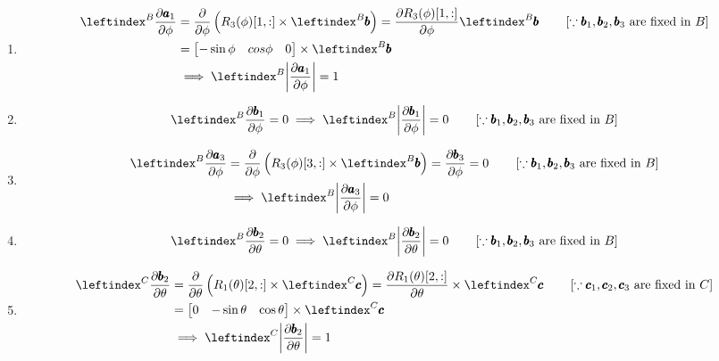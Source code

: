 \begin{enumerate}
 \item
 \begin{align*}
   \lx{^B}{\frac {\partial \pmb a_1}  {\partial \phi}}&=
   \frac{\partial}{\partial \phi} \left(R_3(\phi)[1, :]  \times \lx{^B}{\pmb b} \right)
   = \frac{\partial R_3(\phi)[1, :]}{\partial \phi} \lx{^B}{\pmb b}
   \qquad \left[\because \pmb b_1, \pmb b_2,  \pmb b_3
   \text{ are fixed in } B \right]\\
   &= \bm{-\sin \phi & cos \phi & 0}
    \times \lx{^B}{\pmb b}\\
    &\implies \lx{^B}{\norm{\frac {\partial \pmb a_1}  {\partial \phi}}} = 1
 \end{align*}

 \item
 \begin{align*}
    \lx{^B}{\frac {\partial \pmb b_1}  {\partial \phi}} &= 0
    \implies \lx{^B}{\norm{ \frac {\partial \pmb b_1}  {\partial \phi}}} = 0
   \qquad \left[\because \pmb b_1, \pmb b_2,  \pmb b_3
   \text{ are fixed in } B \right]\\
 \end{align*}

 \item
 \begin{align*}
    \lx{^B}{\frac {\partial \pmb a_3}  {\partial \phi}} &=
   \frac{\partial}{\partial \phi} \left(R_3(\phi)[3, :]  \times \lx{^B}{\pmb b} \right)
   = \frac{\partial \pmb b_3}{\partial \phi}
   = 0
   \qquad \left[\because \pmb b_1, \pmb b_2,  \pmb b_3
   \text{ are fixed in } B \right]\\
   &\implies \lx{^B}{\norm{\frac {\partial \pmb a_3}  {\partial \phi}}} = 0
 \end{align*}


 \item
 \begin{align*}
    \lx{^B}{\frac {\partial \pmb b_2}  {\partial \theta}} &= 0
    \implies \lx{^B}{\norm{\frac {\partial \pmb b_2}  {\partial \theta}}} = 0
    \qquad \left[\because \pmb b_1, \pmb b_2,  \pmb b_3
   \text{ are fixed in } B \right]\\
 \end{align*}

\item
\begin{align*}
    \lx{^C}{\frac {\partial \pmb b_2}  {\partial \theta}} &= \frac {\partial}  {\partial \theta} \left( R_1(\theta)[2,:] \times \lx{^C}{\pmb c} \right)
    = \frac{\partial R_1(\theta)[2,:]}{\partial \theta} \times \lx{^C}{\pmb c}
    \qquad \left[\because \pmb c_1, \pmb c_2, \pmb c_3 \text{ are fixed in } C \right]\\
    &= \bm{0 & -\sin \theta & \cos \theta} \times \lx{^C}{\pmb c}\\
    &\implies \lx{^C}{\norm{\frac {\partial \pmb b_2}  {\partial \theta}}} = 1
\end{align*}



\end{enumerate}
